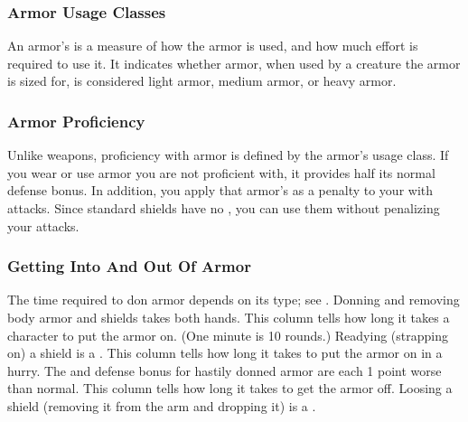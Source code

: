         \subsubsection{Armor Usage Classes}\label{Armor Usage Classes}
            An armor's  is a measure of how the armor is used, and how much effort is required to use it.
            It indicates whether armor, when used by a creature the armor is sized for, is considered light armor, medium armor, or heavy armor.

        \subsubsection{Armor Proficiency}\label{Armor Proficiency}
            Unlike weapons, proficiency with armor is defined by the armor's usage class.
            If you wear or use armor you are not proficient with, it provides half its normal defense bonus.
            In addition, you apply that armor's  as a penalty to your  with  attacks.
            Since standard shields have no , you can use them without penalizing your attacks.

        \subsubsection{Getting Into And Out Of Armor}
            The time required to don armor depends on its type; see . Donning and removing body armor and shields takes both hands.
             This column tells how long it takes a character to put the armor on. (One minute is 10 rounds.) Readying (strapping on) a shield is a .
             This column tells how long it takes to put the armor on in a hurry. The  and defense bonus for hastily donned armor are each 1 point worse than normal.
             This column tells how long it takes to get the armor off. Loosing a shield (removing it from the arm and dropping it) is a .


